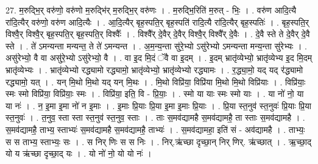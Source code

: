 \documentclass[17pt]{extarticle}
\begin{document}
27. म॒रुद्भि॒र् वरु॑णो॒ वरु॑णो म॒रुद्भि॑र् म॒रुद्भि॒र् वरु॑णः । . म॒रुद्भि॒रिति॑ म॒रुत् - भिः॒ । . वरु॑ण आदि॒त्यै रा॑दि॒त्यैर् वरु॑णो॒ वरु॑ण आदि॒त्यैः । . आ॒दि॒त्यैर् बृह॒स्पति॒र् बृह॒स्पति॑ रादि॒त्यै रा॑दि॒त्यैर् बृह॒स्पतिः॑ । . बृह॒स्पति॒र् विश्वै॒र् विश्वै॒र् बृह॒स्पति॒र् बृह॒स्पति॒र् विश्वैः᳚ । . विश्वै᳚र् दे॒वैर् दे॒वैर् विश्वै॒र् विश्वै᳚र् दे॒वैः । . दे॒वै स्ते ते दे॒वैर् दे॒वै स्ते । . ते॑ ऽमन्यन्ता मन्यन्त॒ ते ते॑ ऽमन्यन्त । . अ॒म॒न्य॒न्ता सु॑रे॒भ्यो ऽसु॑रेभ्यो ऽमन्यन्ता मन्य॒न्ता सु॑रेभ्यः । . असु॑रेभ्यो॒ वै वा असु॑रे॒भ्यो ऽसु॑रेभ्यो॒ वै । . वा इ॒द मि॒दं ॅवै वा इ॒दम् । . इ॒दम् भ्रातृ॑व्येभ्यो॒ भ्रातृ॑व्येभ्य इ॒द मि॒दम् भ्रातृ॑व्येभ्यः । . भ्रातृ॑व्येभ्यो रद्ध्यामो रद्ध्यामो॒ भ्रातृ॑व्येभ्यो॒ भ्रातृ॑व्येभ्यो रद्ध्यामः । . र॒द्ध्या॒मो॒ यद् यद् र॑द्ध्यामो रद्ध्यामो॒ यत् । . यन् मि॒थो मि॒थो यद् यन् मि॒थः । . मि॒थो विप्रि॑या॒ विप्रि॑या मि॒थो मि॒थो विप्रि॑याः । . विप्रि॑याः॒ स्मः स्मो विप्रि॑या॒ विप्रि॑याः॒ स्मः । . विप्रि॑या॒ इति॒ वि - प्रि॒याः॒ । . स्मो या याः स्मः स्मो याः । . या नो॑ नो॒ या या नः॑ । . न॒ इ॒मा इ॒मा नो॑ न इ॒माः । . इ॒माः प्रि॒याः प्रि॒या इ॒मा इ॒माः प्रि॒याः । . प्रि॒या स्त॒नुव॑ स्त॒नुवः॑ प्रि॒याः प्रि॒या स्त॒नुवः॑ । . त॒नुव॒ स्ता स्ता स्त॒नुव॑ स्त॒नुव॒ स्ताः । . ताः स॒मव॑द्यामहै स॒मव॑द्यामहै॒ ता स्ताः स॒मव॑द्यामहै । . स॒मव॑द्यामहै॒ ताभ्य॒ स्ताभ्यः॑ स॒मव॑द्यामहै स॒मव॑द्यामहै॒ ताभ्यः॑ । . स॒मव॑द्यामहा॒ इति॑ सं - अव॑द्यामहै । . ताभ्यः॒ स स ताभ्य॒ स्ताभ्यः॒ सः । . स निर् णिः स स निः । . निर्.ऋ॑च्छा दृच्छा॒न् निर् णिर्. ऋ॑च्छात् । . ऋ॒च्छा॒द् यो य ऋ॑च्छा दृच्छा॒द् यः । . यो नो॑ नो॒ यो यो नः॑ । \newline
\end{document}
